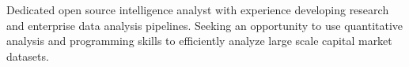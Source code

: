 \documentclass[letter,10pt]{article}
\begin{document}
Dedicated open source intelligence analyst with experience developing research and enterprise data analysis pipelines.  Seeking an opportunity to use quantitative analysis and programming skills to efficiently analyze large scale capital market datasets.
\end{document}
